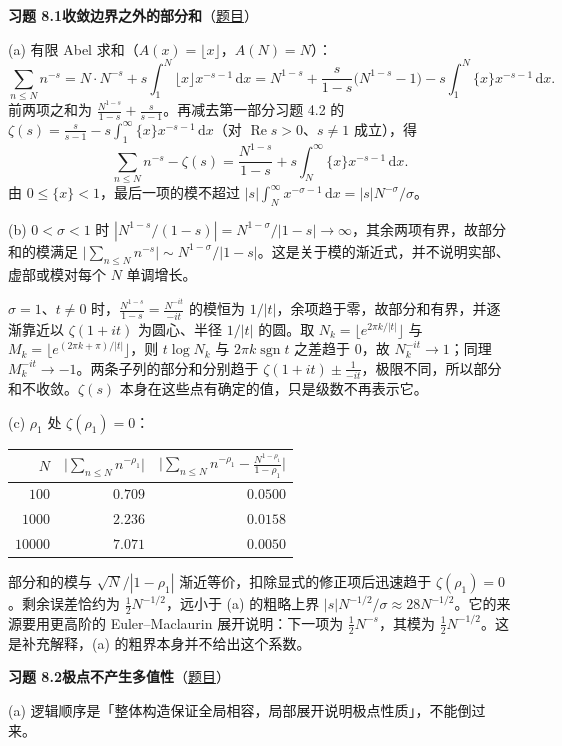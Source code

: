 \documentclass[11pt,a4paper]{article}
\newcommand{\dd}{\,\mathrm{d}}
\renewcommand{\Re}{\operatorname{Re}}
\newcommand{\Sol}[2]{%
  \par\addvspace{1.2em}\noindent
  \hypertarget{s:#1}{}\textbf{习题 #1\quad #2}\hfill{\small（\hyperlink{q:#1}{题目}）}\par
  \nopagebreak\smallskip}
\begin{document}
\Sol{8.1}{收敛边界之外的部分和}
(a) 有限 Abel 求和（$A(x)=\lfloor x\rfloor$，$A(N)=N$）：
\[
  \sum_{n\le N}n^{-s}=N\cdot N^{-s}+s\int_1^N\lfloor x\rfloor x^{-s-1}\dd x
  =N^{1-s}+\frac{s}{1-s}\bigl(N^{1-s}-1\bigr)-s\int_1^N\{x\}x^{-s-1}\dd x .
\]
前两项之和为 $\frac{N^{1-s}}{1-s}+\frac{s}{s-1}$。再减去第一部分习题 4.2 的
$\zeta(s)=\frac{s}{s-1}-s\int_1^\infty\{x\}x^{-s-1}\dd x$（对 $\Re s>0$、$s\ne1$ 成立），得
\[
  \sum_{n\le N}n^{-s}-\zeta(s)=\frac{N^{1-s}}{1-s}+s\int_N^\infty\{x\}x^{-s-1}\dd x .
\]
由 $0\le\{x\}<1$，最后一项的模不超过 $|s|\int_N^\infty x^{-\sigma-1}\dd x=|s|N^{-\sigma}/\sigma$。

(b) $0<\sigma<1$ 时 $|N^{1-s}/(1-s)|=N^{1-\sigma}/|1-s|\to\infty$，其余两项有界，故部分和的模满足 $\bigl|\sum_{n\le N}n^{-s}\bigr|\sim N^{1-\sigma}/|1-s|$。这是关于模的渐近式，并不说明实部、虚部或模对每个 $N$ 单调增长。

$\sigma=1$、$t\ne0$ 时，$\frac{N^{1-s}}{1-s}=\frac{N^{-it}}{-it}$ 的模恒为 $1/|t|$，余项趋于零，故部分和有界，并逐渐靠近以 $\zeta(1+it)$ 为圆心、半径 $1/|t|$ 的圆。取 $N_k=\lfloor e^{2\pi k/|t|}\rfloor$ 与 $M_k=\lfloor e^{(2\pi k+\pi)/|t|}\rfloor$，则 $t\log N_k$ 与 $2\pi k\operatorname{sgn}t$ 之差趋于 $0$，故 $N_k^{-it}\to1$；同理 $M_k^{-it}\to-1$。两条子列的部分和分别趋于 $\zeta(1+it)\pm\frac1{-it}$，极限不同，所以部分和不收敛。$\zeta(s)$ 本身在这些点有确定的值，只是级数不再表示它。

(c) $\rho_1$ 处 $\zeta(\rho_1)=0$：
\begin{center}
\begin{tabular}{rrr}
\toprule
$N$ & $\bigl|\sum_{n\le N}n^{-\rho_1}\bigr|$ & $\bigl|\sum_{n\le N}n^{-\rho_1}-\frac{N^{1-\rho_1}}{1-\rho_1}\bigr|$\\
\midrule
$100$ & $0.709$ & $0.0500$\\
$1000$ & $2.236$ & $0.0158$\\
$10000$ & $7.071$ & $0.0050$\\
\bottomrule
\end{tabular}
\end{center}
部分和的模与 $\sqrt N/|1-\rho_1|$ 渐近等价，扣除显式的修正项后迅速趋于 $\zeta(\rho_1)=0$。剩余误差恰约为 $\tfrac12N^{-1/2}$，远小于 (a) 的粗略上界 $|s|N^{-1/2}/\sigma\approx28N^{-1/2}$。它的来源要用更高阶的 Euler--Maclaurin 展开说明：下一项为 $\tfrac12N^{-s}$，其模为 $\tfrac12N^{-1/2}$。这是补充解释，(a) 的粗界本身并不给出这个系数。

\Sol{8.2}{极点不产生多值性}
(a) 逻辑顺序是「整体构造保证全局相容，局部展开说明极点性质」，不能倒过来。
\end{document}
